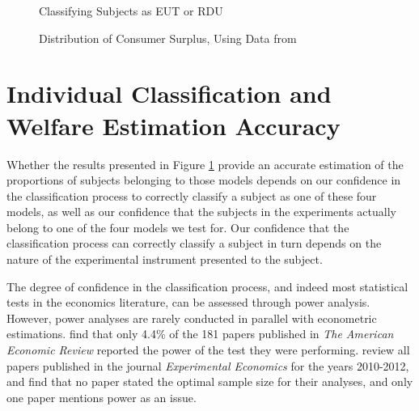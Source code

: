 \documentclass[../main.tex]{subfiles}
\begin{document}
\begin{figure}[h!]
	\center
	\caption{Classifying Subjects as EUT or RDU}
	\label{fig:HN_pvals}
\end{figure}

\begin{figure}[h!]
	\center
	\caption{Distribution of Consumer Surplus, Using Data from \textcite{Harrison2016}}
	\label{fig:HN_CS}
\end{figure}

\section{Individual Classification and Welfare Estimation Accuracy}
\label{sec4:IC}

Whether the results presented in Figure \ref{fig:HN_pvals} provide an accurate estimation of the proportions of subjects belonging to those models depends on our confidence in the classification process to correctly classify a subject as one of these four models, as well as our confidence that the subjects in the experiments actually belong to one of the four models we test for.
Our confidence that the classification process can correctly classify a subject in turn depends on the nature of the experimental instrument presented to the subject.

The degree of confidence in the classification process, and indeed most statistical tests in the economics literature, can be assessed through power analysis.{\footnotemark}
However, power analyses are rarely conducted in parallel with econometric estimations.
\textcite{McCloskey1996} find that only 4.4\% of the 181 papers published in \textit{The American Economic Review} reported the power of the test they were performing.
\textcite[6]{Zhang2013} review all papers published in the journal \textit{Experimental Economics} for the years 2010-2012, and find that no paper stated the optimal sample size for their analyses, and only one paper mentions power as an issue.

\end{document}

